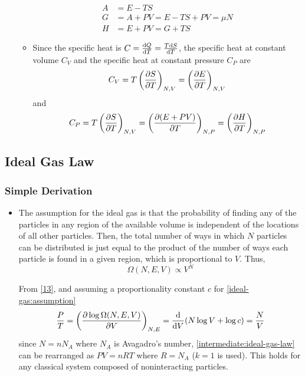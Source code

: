 \documentclass{article}
\begin{document}
\begin{itemize}
\begin{itemize}
\begin{align}
            A&=E-TS\\
            G&=A+PV=E-TS+PV=\mu N\\
            H&=E+PV=G+TS
        \end{align}
        \item Since the specific heat is $C=\derivative{Q}{T}=\frac{T\dd S}{\dd T}$, the specific heat at constant volume $C_V$ and the specific heat at constant pressure $C_P$ are
        \begin{equation}
            C_V=T\left(\partialderivative{S}{T}\right)_{N,V}=\left(\partialderivative{E}{T}\right)_{N,V}\label{cv}
        \end{equation}
        and
        \begin{equation}
            C_P=T\left(\partialderivative{S}{T}\right)_{N,V}=\left(\partialderivative{(E+PV)}{T}\right)_{N,P}=\left(\partialderivative{H}{T}\right)_{N,P}\label{cp}
        \end{equation}
    \end{itemize}
\end{itemize}
\subsection{Ideal Gas Law}
\subsubsection{Simple Derivation}
\begin{itemize}
    \item The assumption for the ideal gas is that the probability of finding any of the particles in any region of the available volume is independent of the locations of all other particles. Then, the total number of ways in which $N$ particles can be distributed is just equal to the product of the number of ways each particle is found in a given region, which is proportional to $V$. Thus,
    \begin{equation}
        \Omega(N,E,V)\propto V^N\label{ideal-gas:assumption}
    \end{equation}
    \begin{derivation}
        From \eqref{13}, and assuming a proportionality constant $c$ for \eqref{ideal-gas:assumption}
        \begin{equation}
            \frac{P}{T}=\left(\partialderivative{\log\Omega(N,E,V)}{V}\right)_{N,E}=\frac{\dd}{\dd V}(N\log V+\log c)=\frac{N}{V}\label{intermediate:ideal-gas-law}
        \end{equation}
        since $N=n N_A$ where $N_A$ is Avagadro's number, \eqref{intermediate:ideal-gas-law} can be rearranged as $PV=nRT$ where $R=N_A$ ($k=1$ is used). This holds for any classical system composed of noninteracting particles.
    \end{derivation}
\end{itemize}
\end{document}
